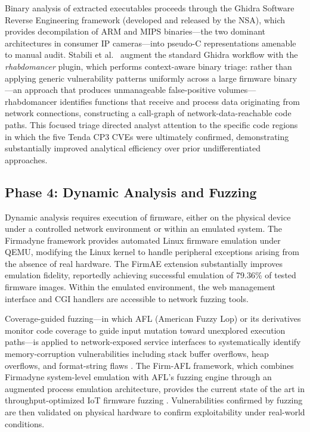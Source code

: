 \documentclass[letterpaper, 10pt, conference]{ieeeconf}
\begin{document}
Binary analysis of extracted executables proceeds through the Ghidra
Software Reverse Engineering framework (developed and released by
the NSA), which provides decompilation of ARM and MIPS binaries---the
two dominant architectures in consumer IP cameras---into pseudo-C
representations amenable to manual audit. Stabili et al.~\cite{stabili2024}
augment the standard Ghidra workflow with the \textit{rhabdomancer}
plugin, which performs context-aware binary triage: rather than
applying generic vulnerability patterns uniformly across a large
firmware binary---an approach that produces unmanageable false-positive
volumes---rhabdomancer identifies functions that receive and process
data originating from network connections, constructing a call-graph
of network-data-reachable code paths. This focused triage directed
analyst attention to the specific code regions in which the five Tenda
CP3 CVEs were ultimately confirmed, demonstrating substantially improved
analytical efficiency over prior undifferentiated approaches.

\subsection{Phase 4: Dynamic Analysis and Fuzzing}

Dynamic analysis requires execution of firmware, either on the physical
device under a controlled network environment or within an emulated
system. The Firmadyne framework \cite{charmanas2023} provides automated
Linux firmware emulation under QEMU, modifying the Linux kernel to
handle peripheral exceptions arising from the absence of real hardware.
The FirmAE extension \cite{firmae2020} substantially improves emulation
fidelity, reportedly achieving successful emulation of 79.36\% of tested
firmware images. Within the emulated environment, the web management
interface and CGI handlers are accessible to network fuzzing tools.

Coverage-guided fuzzing---in which AFL (American Fuzzy Lop) or its
derivatives monitor code coverage to guide input mutation toward
unexplored execution paths---is applied to network-exposed service
interfaces to systematically identify memory-corruption vulnerabilities
including stack buffer overflows, heap overflows, and format-string
flaws \cite{feng2023}. The Firm-AFL framework, which combines Firmadyne
system-level emulation with AFL's fuzzing engine through an augmented
process emulation architecture, provides the current state of the art
in throughput-optimized IoT firmware fuzzing \cite{firmafl2019}.
Vulnerabilities confirmed by fuzzing are then validated on physical
hardware to confirm exploitability under real-world conditions.
\end{document}
